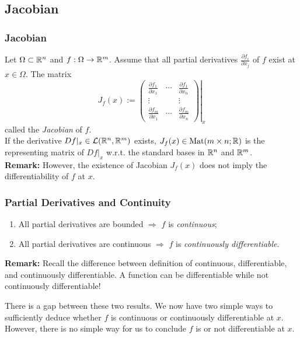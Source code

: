 \documentclass[12pt, t]{beamer}
\renewcommand{\emph}[1]{{\color{Turquoise3}\textsl{#1}}}
\newcommand{\nullspace}{~\\[15pt]}
\begin{document}
\subsection{Jacobian}
\begin{frame}
    \frametitle{Jacobian}
    Let $\Omega\subset\mathbb{R}^n$ and $f:\Omega\to\mathbb{R}^m$. Assume that all partial derivatives $\frac{\partial f_i}{\partial x_j}$ of $f$ exist at $x\in\Omega$. The matrix
    \[J_f(x):=\left.\begin{pmatrix}
            \frac{\partial f_1}{\partial x_1} & \cdots & \frac{\partial f_1}{\partial x_n} \\
            \vdots                            &        & \vdots                            \\
            \frac{\partial f_m}{\partial x_1} & \cdots & \frac{\partial f_m}{\partial x_n}
        \end{pmatrix}\right|_x\]
    called the \emph{Jacobian} of $f$.\\[4pt]
    If the derivative $Df|_x\in\mathcal{L}(\mathbb{R}^n,\mathbb{R}^m)$ exists, $J_f(x)\in\text{Mat}(m\times n;\mathbb{R})$ is the representing matrix of $Df|_x$ w.r.t. the standard bases in $\mathbb{R}^n$ and $\mathbb{R}^m$.
    \nullspace
    \textbf{Remark:} However, the existence of Jacobian $J_f(x)$ does not imply the differentiability of $f$ at $x$.
\end{frame}

\begin{frame}
    \frametitle{Partial Derivatives and Continuity}
    \begin{enumerate}
        \item All partial derivatives are bounded $\Rightarrow$ $f$ is \emph{continuous};
        \item All partial derivatives are continuous $\Rightarrow$ $f$ is \emph{continuously differentiable}.
    \end{enumerate}
    \textbf{Remark:} Recall the difference between definition of continuous, differentiable, and continuously differentiable. A function can be differentiable while not continuously differentiable!

    There is a gap between these two results. We now have two simple ways to sufficiently deduce whether $f$ is continuous or continuously differentiable at $x$. However, there is no simple way for us to conclude $f$ is or not differentiable at $x$.
\end{frame}
\end{document}
